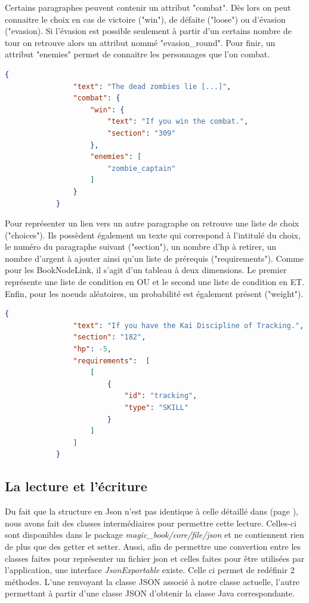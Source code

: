 			Certains paragraphes peuvent contenir un attribut "combat". Dès lors on peut connaitre le choix en cas de victoire ("win"), de défaite ("loose") ou d'évasion ("evasion). Si l'évasion est possible seulement à partir d'un certains nombre de tour on retrouve alors un attribut nommé "evasion\_round". Pour finir, un attribut "enemies" permet de connaitre les personnages que l'on combat.

			\begin{lstlisting}[gobble=12, language=json, caption=Exemple de paragraphe avec des combats]
			{
				"text": "The dead zombies lie [...]",
				"combat": {
					"win": {
						"text": "If you win the combat.",
						"section": "309"
					},
					"enemies": [
						"zombie_captain"
					]
				}
			}
			\end{lstlisting}

			Pour représenter un lien vers un autre paragraphe on retrouve une liste de choix ("choices"). Ils possèdent également un texte qui correspond à l'intitulé du choix, le numéro du paragraphe suivant ("section"), un nombre d'hp à retirer, un nombre d'argent à ajouter ainsi qu'un liste de prérequis ("requirements"). Comme pour les BookNodeLink, il s'agit d'un tableau à deux dimensions. Le premier représente une liste de condition en OU et le second une liste de condition en ET. Enfin, pour les noeuds aléatoires, un probabilité est également présent ("weight").

			\begin{lstlisting}[gobble=12, language=json, caption=Exemple de choix]
			{
				"text": "If you have the Kai Discipline of Tracking.",
				"section": "182",
				"hp": -5,
				"requirements":  [
					[
						{
							"id": "tracking",
							"type": "SKILL"
						}
					]
				]
			}
			\end{lstlisting}

		\subsection{La lecture et l'écriture}
			\label{subsec:lecture_ecriture_fichier}

			Du fait que la structure en Json n'est pas identique à celle détaillé dans  (page \pageref{sec:representation_livre}), nous avons fait des classes intermédiaires pour permettre cette lecture. Celles-ci sont disponibles dans le package \textit{magic\_book/core/file/json} et ne contiennent rien de plus que des getter et setter. Aussi, afin de permettre une convertion entre les classes faites pour représenter un fichier json et celles faites pour être utilisées par l'application, une interface \textit{JsonExportable} existe. Celle ci permet de redéfinir 2 méthodes. L'une renvoyant la classe JSON associé à notre classe actuelle, l'autre permettant à partir d'une classe JSON d'obtenir la classe Java correspondante.

